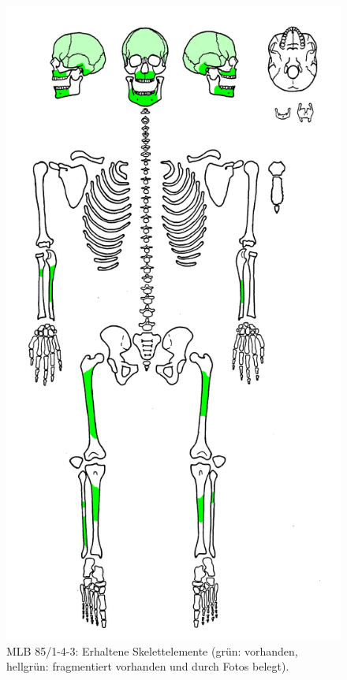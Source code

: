 \begin{figure}[p]
	\begin{minipage}[b]{.4\textwidth}
 		\caption{MLB 85/1-4-3: Erhaltene Skelettelemente (grün: vorhanden, hellgrün: fragmentiert vorhanden und durch Fotos belegt).}\label{fig:MLB85-1_SekBest_Skelettbild}
	\end{minipage}\hfill
	\begin{minipage}[b]{.55\textwidth}
 		\includegraphics[width=\textwidth]{fig/MLB85-143_Skelettbild_2013-11-09.jpg}
	\end{minipage}
\end{figure}

